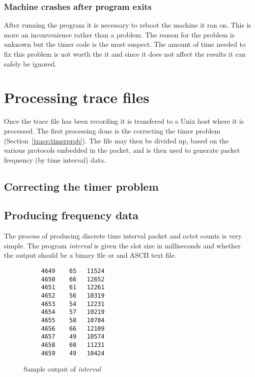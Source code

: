 \subsubsection{Machine crashes after program exits}

After running the program it is necessary to reboot the machine it ran
on.  This is more an inconvenience rather than a problem.  The reason
for the problem is unknown but the timer code is the most suspect.
The amount of time needed to fix this problem is not worth the it and
since it does not affect the results it can safely be ignored.

\section{Processing trace files}

Once the trace file has been recording it is transfered to a Unix host
where it is processed.  The first processing done is the correcting
the timer problem (Section~\ref{trace:timerprob}).  The file may then
be divided up, based on the various protocols embedded in the packet,
and is then used to generate packet frequency (by time interval)
data.

\subsection{Correcting the timer problem}

\subsection{Producing frequency data}

The process of producing discrete time interval packet and octet
counts is very simple.  The program {\em interval} is given the slot
size in milliseconds and whether the output should be a binary file or
and ASCII text file.

\begin{figure}
\begin{verbatim}
     4649    65   11524
     4650    66   12652
     4651    61   12261
     4652    56   10319
     4653    54   12231
     4654    57   10219
     4655    58   10704
     4656    66   12109
     4657    49   10574
     4658    60   11231
     4659    49   10424
\end{verbatim}
\caption{Sample output of {\em interval}}
\label{interval:figure1}
\end{figure}

